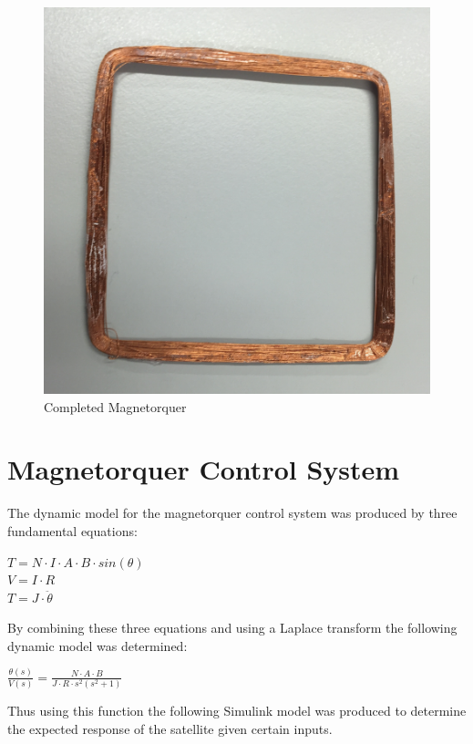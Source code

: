 \vspace{-6mm}
\begin{center}
\begin{figure}[H]
\caption{Completed Magnetorquer}
\vspace{-4mm}
\centering
\includegraphics[scale = 0.4]{Magnetorquer.png}
\end{figure}
\end{center}
\vspace{-5mm}

\section{Magnetorquer Control System}
The dynamic model for the magnetorquer control system was produced by three fundamental equations:
\begin{center}
$T = N \cdot I \cdot A \cdot B \cdot sin(\theta)$ \vspace{2mm} \\
$V = I \cdot R$\vspace{2mm}\\
$T = J \cdot \ddot{\theta}$\\
\end{center}
By combining these three equations and using a Laplace transform the following dynamic model was determined:
\begin{center}
$\frac{\theta(s)}{V(s)} = \frac{N \cdot A \cdot B}{J \cdot R \cdot s^2 (s^2 + 1)}$
\end{center}
Thus using this function the following Simulink model was produced to determine the expected response of the satellite given certain inputs.


